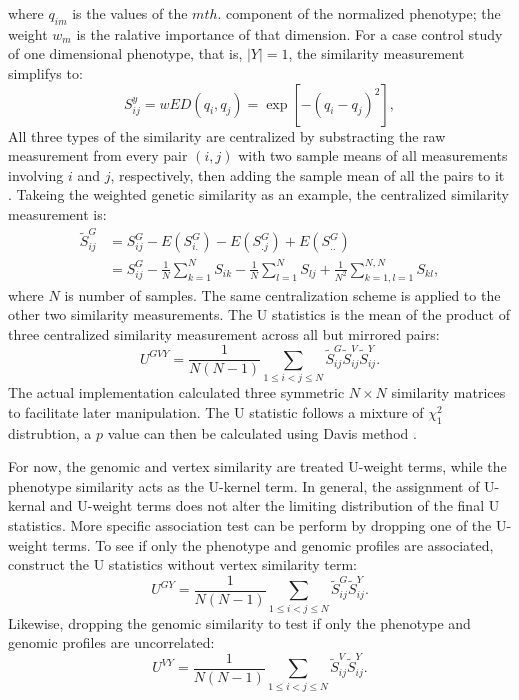 where $q_{im}$ is the values of the $m th.$ component of the normalized phenotype; the weight $w_m$ is the ralative importance of that dimension. For a case control study of one dimensional phenotype, that is, $|Y|=1$, the similarity measurement simplifys to:
\begin{displaymath}
  S_{ij}^{y}=wED(q_i,q_j)=\exp{[-(q_i-q_j)^2]},
\end{displaymath}
All three types of the similarity are centralized by substracting the raw measurement from every pair $(i,j)$ with two sample means of all measurements involving $i$ and $j$, respectively, then adding the sample mean of all the pairs to it \cite{HWU}. Takeing the weighted genetic similarity as an example, the centralized similarity measurement is:
\begin{equation} \label{eq_wSY}
\begin{split}
  \tilde{S}_{ij}^{G} &= S_{ij}^{G}-E(S_{i.}^{G})-E(S_{.j}^{G})+E(S_{..}^{G}) \\
  &= S_{ij}^{G} - \frac{1}{N}\sum_{k=1}^N{S_{ik}} - \frac{1}{N}\sum_{l=1}^N{S_{lj}} + \frac{1}{N^2}\sum_{k=1,l=1}^{N,N}{S_{kl}},
\end{split}
\end{equation}
where $N$ is number of samples. The same centralization scheme is applied to the other two similarity measurements. The U statistics is the mean of the product of three centralized similarity measurement across all but mirrored pairs:
\begin{displaymath}
  U^{GVY}=\frac{1}{N(N-1)}\sum_{1 \leq i < j \leq N} \tilde{S}_{ij}^{G} \tilde{S}_{ij}^{V} \tilde{S}_{ij}^{Y}.
\end{displaymath}
The actual implementation calculated three symmetric $N \times N$ similarity matrices to facilitate later manipulation. The U statistic follows a mixture of $\chi_1^2$ distrubtion, a $p$ value can then be calculated using Davis method \cite{HWU}.

For now, the genomic and vertex similarity are treated U-weight terms, while the phenotype similarity acts as the U-kernel term. In general, the assignment of U-kernal and U-weight terms does not alter the limiting distribution of the final U statistics. More specific association test can be perform by dropping one of the U-weight terms. To see if only the phenotype and genomic profiles are associated, construct the U statistics without vertex similarity term:
\begin{displaymath}
  U^{GY}=\frac{1}{N(N-1)}\sum_{1 \leq i < j \leq N} \tilde{S}_{ij}^{G} \tilde{S}_{ij}^{Y}.
\end{displaymath}
Likewise, dropping the genomic similarity to test if only the phenotype and genomic profiles are uncorrelated:
\begin{displaymath}
  U^{VY}=\frac{1}{N(N-1)}\sum_{1 \leq i < j \leq N} \tilde{S}_{ij}^{V} \tilde{S}_{ij}^{Y}.
\end{displaymath}

